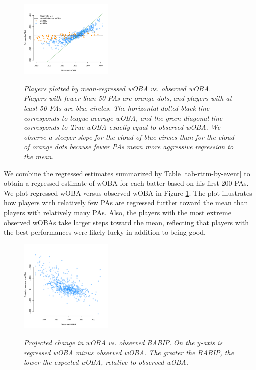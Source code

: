 \documentclass[11pt]{article}
\begin{document}
\begin{figure}[h]
\caption{\it Players plotted by mean-regressed wOBA vs. observed wOBA.
    Players with fewer than 50 PAs are orange dots, and players with at least 50
    PAs are blue circles. The horizontal dotted black line corresponds to
    league average wOBA, and the green diagonal line corresponds to True wOBA
    exactly equal to observed wOBA. We observe a steeper slope for the cloud
    of blue circles than for the cloud of orange dots because fewer PAs mean
    more aggressive regression to the mean.}
\centering
\includegraphics[width = 0.4\textwidth]{../figs/woba-observed-v-estimated.pdf}
\label{fig-woba-obs-v-est}
\end{figure}

We combine the regressed estimates summarized by Table \ref{tab-rttm-by-event}
to obtain a regressed estimate of wOBA for each batter based on his first 200
PAs. We plot regressed wOBA versus observed wOBA in Figure
\ref{fig-woba-obs-v-est}. The plot illustrates how players with relatively few
PAs are regressed further toward the mean than players with relatively many PAs.
Also, the players with the most extreme observed wOBAs take larger steps toward
the mean, reflecting that players with the best performances were likely lucky
in addition to being good.

\begin{figure}[h!]
\caption{\it Projected change in wOBA vs. observed BABIP. On the $y$-axis is
    regressed wOBA minus observed wOBA. The greater the
    BABIP, the lower the expected wOBA, relative to observed wOBA.}
\centering
\includegraphics[width = 0.4\textwidth]{../figs/woba-v-babip.pdf}
\label{fig-woba-v-babip}
\end{figure}
\end{document}
